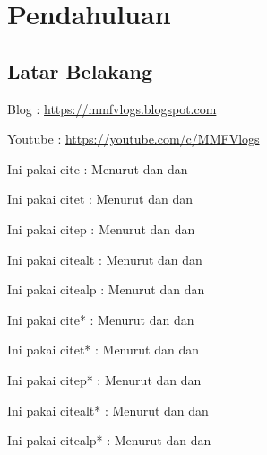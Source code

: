 \documentclass[a4paper]{book}
\begin{document}
\tableofcontents

\chapter{Pendahuluan}

\section{Latar Belakang}

Blog : \url{https://mmfvlogs.blogspot.com}

Youtube : \url{https://youtube.com/c/MMFVlogs}

Ini pakai cite : Menurut \cite{Beiser2002-jh} dan \cite{Arfken2005-ce} dan \cite{Greiner2000-ks}

Ini pakai citet : Menurut \citet{Beiser2002-jh} dan \citet{Arfken2005-ce} dan \citet{Greiner2000-ks}

Ini pakai citep : Menurut \citep{Beiser2002-jh} dan \citep{Arfken2005-ce} dan \citep{Greiner2000-ks}

Ini pakai citealt : Menurut \citealt{Beiser2002-jh} dan \citealt{Arfken2005-ce} dan \citealt{Greiner2000-ks}

Ini pakai citealp : Menurut \citealp{Beiser2002-jh} dan \citealp{Arfken2005-ce} dan \citealp{Greiner2000-ks}

Ini pakai cite* : Menurut \cite*{Beiser2002-jh} dan \cite*{Arfken2005-ce} dan \cite*{Greiner2000-ks}

Ini pakai citet* : Menurut \citet*{Beiser2002-jh} dan \citet*{Arfken2005-ce} dan \citet*{Greiner2000-ks}

Ini pakai citep* : Menurut \citep*{Beiser2002-jh} dan \citep*{Arfken2005-ce} dan \citep*{Greiner2000-ks}

Ini pakai citealt* : Menurut \citealt*{Beiser2002-jh} dan \citealt{Arfken2005-ce} dan \citep*{Greiner2000-ks}

Ini pakai citealp* : Menurut \citealp*{Beiser2002-jh} dan \citealp*{Arfken2005-ce} dan \citealp*{Greiner2000-ks}



\end{document}
